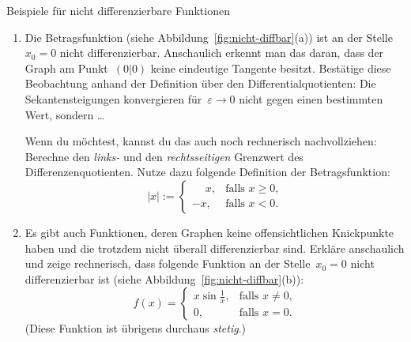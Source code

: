 \documentclass[twoside]{../zirkelblatt}
\theoremstyle{definition}
\theoremstyle{plain}
\theoremstyle{remark}
\begin{document}
\begin{aufgabeShaded}{Beispiele für nicht differenzierbare Funktionen}
\label{aufg:nichtdb}
\begin{enumerate}
\item Die Betragsfunktion (siehe Abbildung~\ref{fig:nicht-diffbar}(a)) ist an der
Stelle~$x_0 = 0$ nicht differenzierbar. Anschaulich erkennt man das daran, dass
der Graph am Punkt~$(0|0)$ keine eindeutige Tangente besitzt.\footnotemark{}
Bestätige diese Beobachtung anhand der Definition über den
Differentialquotienten: Die Sekantensteigungen konvergieren für~$\varepsilon
\to 0$ nicht gegen einen bestimmten Wert, sondern \ldots

Wenn du möchtest, kannst du das auch noch rechnerisch nachvollziehen: Berechne
den \emph{links-} und den \emph{rechtsseitigen} Grenzwert des
Differenzenquotienten. Nutze dazu folgende Definition der Betragsfunktion:
\[ |x| := \begin{cases}\phantom{-}x, & \text{falls $x \geq 0$,} \\ -x, & \text{falls $x <
0$.}\end{cases} \]
\item Es gibt auch Funktionen, deren Graphen keine offensichtlichen
Knickpunkte haben und die trotzdem nicht überall differenzierbar sind. Erkläre
anschaulich und zeige rechnerisch, dass folgende Funktion an der Stelle~$x_0 =
0$ nicht differenzierbar ist (siehe Abbildung~\ref{fig:nicht-diffbar}(b)):
\[ f(x) = \begin{cases}x \sin\frac{1}{x}, & \text{falls $x \neq 0$,} \\
0, & \text{falls $x = 0$.}\end{cases} \]
(Diese Funktion ist übrigens durchaus \emph{stetig}.)
\end{enumerate}
\end{aufgabeShaded}
\end{document}
